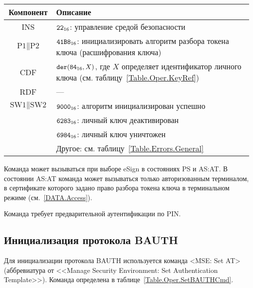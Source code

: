 \begin{table}[hbt]
\caption{}\label{Table.Oper.SetCTCmd}
\begin{tabular}{|c|p{14cm}|}
\hline
Компонент & Описание \\
\hline
\hline
INS & $\texttt{22}_{16}$: управление средой безопасности\\ 
\hline
$\text{P1} \parallel\text{P2}$ & $\texttt{41B8}_{16}$: 
инициализировать алгоритм разбора токена ключа
(расшифрования ключа) \\
\hline
CDF & 
$\texttt{der}(\texttt{84}_{16}, X)$, 
где $X$ определяет идентификатор личного ключа
(см. таблицу~\ref{Table.Oper.KeyRef})\\
\hline
\hline
RDF &  --- \\
\hline
$\text{SW1} \parallel \text{SW2}$ & 
$\texttt{9000}_{16}$: алгоритм инициализирован успешно \\
\cline{2-2}
  & $\texttt{6283}_{16}$: личный ключ деактивирован \\
\cline{2-2}
  & $\texttt{6984}_{16}$: личный ключ уничтожен \\
\cline{2-2}
  & Другое: см. таблицу~\ref{Table.Errors.General} \\
\hline
\end{tabular}
\end{table}

Команда может вызываться при выборе eSign в состояниях PS и AS:AT. В состоянии 
AS:AT команда может вызываться только авторизованным терминалом, в сертификате 
которого задано право разбора токена ключа в терминальном режиме 
(см.~\ref{DATA.Access}). 

Команда требует предварительной аутентификации по PIN. 

\subsection{Инициализация протокола BAUTH}
\label{Oper.Descr.SetBAUTH}

Для инициализации протокола BAUTH используется команда <MSE: Set AT> 
(аббревиатура от <<Manage Security Environment: Set Authentication Template>>).
Команда определена в таблице~\ref{Table.Oper.SetBAUTHCmd}.

